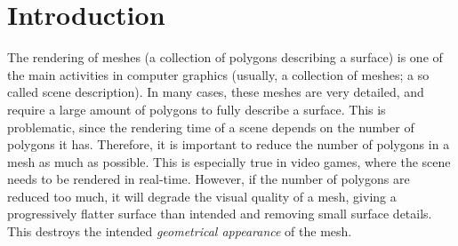 

\chapter{Introduction}
\label{cha:introduction}

\iffalse
For many years the field of computer graphics has been an important part in many industries, but especially in the entertainment industry (for instance video games and motion pictures). These industries generate a lot of money, and are quickly growing in size. A recent survey by \emph{Kroon and Nilsson}~\cite{kroon2017game} from \emph{Dataspelsbranschen} have shown that the video games industry in Sweden generated \euro 1325 M in revenue in 2016, a steep increase from the \euro 392 M in 2012. Also, most movies nowadays use to some extent 3-D computer graphics in scenes where the cost would be to large to reproduce in reality, be too risky for actors, or simply be impossible.
\fi


The rendering of meshes (a collection of polygons describing a surface) is one of the main activities in computer graphics (usually, a collection of meshes; a so called scene description). In many cases, these meshes are very detailed, and require a large amount of polygons to fully describe a surface. This is problematic, since the rendering time of a scene depends on the number of polygons it has. Therefore, it is important to reduce the number of polygons in a mesh as much as possible. This is especially true in video games, where the scene needs to be rendered in real-time. However, if the number of polygons are reduced too much, it will degrade the visual quality of a mesh, giving a progressively flatter surface than intended and removing small surface details. This destroys the intended \emph{geometrical appearance} of the mesh.



